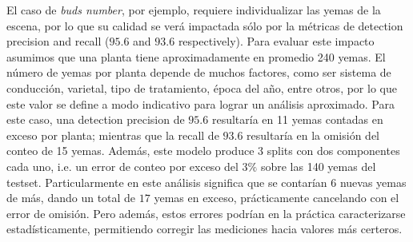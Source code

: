 \documentclass[a4paper,authoryear,review]{elsarticle}
\begin{document}
 
%
El caso de \emph{buds number}, por ejemplo, requiere individualizar las yemas de la escena, por lo que su calidad se verá impactada sólo por la métricas de detection precision and recall ($95.6$ and $93.6$ respectively). Para evaluar este impacto asumimos que una planta tiene aproximadamente en promedio 240 yemas. El número de yemas por planta depende de muchos factores, como ser sistema de conducción, varietal, tipo de tratamiento, época del año, entre otros, por lo que este valor se define a modo indicativo para lograr un análisis aproximado. Para este caso, una detection precision de $95.6$ resultaría en 11 yemas contadas en exceso por planta; mientras que la recall de $93.6$ resultaría en la omisión del conteo de 15 yemas. 
%
Además, este modelo produce 3 splits con dos componentes cada uno, i.e. un error de conteo por exceso del $3\%$ sobre las 140 yemas del testset. Particularmente en este análisis significa que se contarían $6$ nuevas yemas de más, dando un total de $17$ yemas en exceso, prácticamente cancelando con el error de omisión. Pero además, estos errores podrían en la práctica caracterizarse estadísticamente, permitiendo corregir las mediciones hacia valores más certeros. 
%
\end{document}

